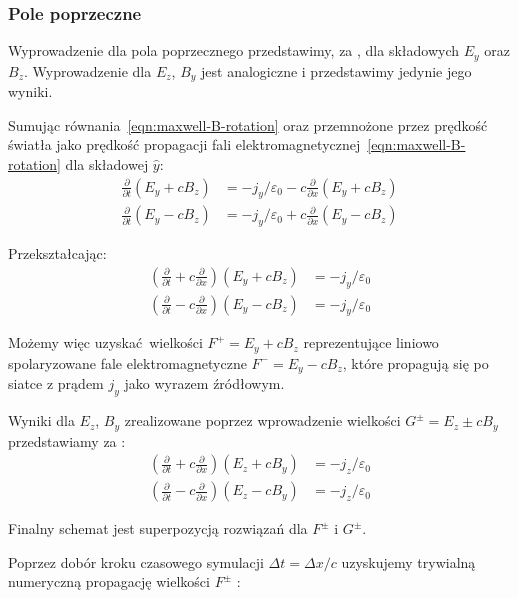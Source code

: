 \subsubsection{Pole poprzeczne}
Wyprowadzenie dla pola poprzecznego przedstawimy, za \cite{birdsall}, dla składowych $E_y$ oraz $B_z$. Wyprowadzenie dla $E_z$, $B_y$ jest analogiczne i przedstawimy jedynie jego wyniki.

Sumując równania~\ref{eqn:maxwell-B-rotation} oraz przemnożone przez prędkość światła jako prędkość propagacji fali elektromagnetycznej~\ref{eqn:maxwell-B-rotation} dla składowej $\hat{y}$:
\begin{align}
    \frac{\partial}{\partial t} \left(E_y + c B_z\right) &= - j_y / \varepsilon_0 - c \frac{\partial}{\partial x} \left(E_y + c B_z\right) \\
    \frac{\partial}{\partial t} \left(E_y - c B_z\right) &= - j_y / \varepsilon_0 + c \frac{\partial}{\partial x} \left(E_y - c B_z\right)
\end{align}

Przekształcając:
\begin{align}
    \left(\frac{\partial}{\partial t} + c \frac{\partial}{\partial x}\right)\left(E_y + c B_z\right) &= - j_y / \varepsilon_0\\
    \left(\frac{\partial}{\partial t} - c \frac{\partial}{\partial x}\right)\left(E_y - c B_z\right) &= - j_y / \varepsilon_0
\end{align}

Możemy więc uzyskać wielkości $F^+ = E_y + c B_z$ reprezentujące liniowo spolaryzowane fale elektromagnetyczne $F^- = E_y - c B_z$, które propagują się po siatce z prądem $j_y$ jako wyrazem źródłowym.

Wyniki dla $E_z$, $B_y$ zrealizowane poprzez wprowadzenie wielkości $G^\pm = E_z \pm c B_y$ przedstawiamy za \cite{birdsall}:
\begin{align}
    \left(\frac{\partial}{\partial t} + c \frac{\partial}{\partial x}\right)\left(E_z + c B_y\right) &= - j_z / \varepsilon_0 \\
    \left(\frac{\partial}{\partial t} - c \frac{\partial}{\partial x}\right)\left(E_z - c B_y\right) &= - j_z / \varepsilon_0
\end{align}

Finalny schemat jest superpozycją rozwiązań dla $F^\pm$ i $G^\pm$.

Poprzez dobór kroku czasowego symulacji $\Delta t = \Delta x / c$ uzyskujemy trywialną numeryczną propagację wielkości $F^\pm$ \cite{Jablonski-notes}:

